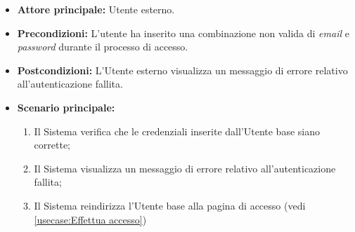 \label{usecase:Accesso fallito}

\begin{itemize}
	\item \textbf{Attore principale:} Utente esterno.
	\item \textbf{Precondizioni:}
    L'utente ha inserito una combinazione non valida di \textit{email} e \textit{password} durante il processo di accesso.
	\item \textbf{Postcondizioni:} L'Utente esterno visualizza un messaggio di errore relativo all'autenticazione fallita.

	\item \textbf{Scenario principale:}
	\begin{enumerate}
        \item Il Sistema verifica che le credenziali inserite dall'Utente base siano corrette;
        \item Il Sistema visualizza un messaggio di errore relativo all'autenticazione fallita;
        \item Il Sistema reindirizza l'Utente base alla pagina di accesso (vedi \autoref{usecase:Effettua accesso})
    \end{enumerate}
	
\end{itemize}